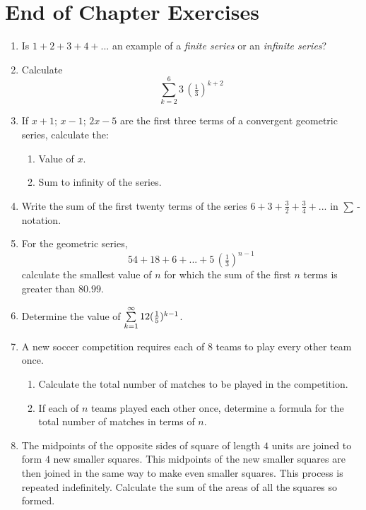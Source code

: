 \section{End of Chapter Exercises}
\begin{enumerate}

\item Is $1 + 2 + 3 + 4 + ...$ an example of a \textit{finite series} or an \textit{infinite series}?

\item Calculate $$\sum_{k=2}^6 3 \, {(\tfrac{1}{3})}^{k+2}$$

\item If $x+1$; $x-1$; $2x-5$ are the first three terms of a convergent geometric series, calculate the:
\begin{enumerate}
\item Value of $x$.
\item Sum to infinity of the series.
\end{enumerate}

\item Write the sum of the first twenty terms of the series $6 + 3 + \tfrac{3}{2} + \tfrac{3}{4} + ...$ in $\sum$\,-notation.

\item For the geometric series, $$54 + 18 + 6 + ... + 5 \, (\tfrac{1}{3})^{n-1}$$ calculate the smallest value of $n$ for which the sum of the first $n$ terms is greater than $80.99$.

\item Determine the value of $\sum_{k=1}^\infty \limits 12(\tfrac{1}{5})^{k-1} $.

\item A new soccer competition requires each of $8$ teams to play every other team once.
\begin{enumerate}
\item Calculate the total number of matches to be played in the competition.
\item If each of $n$ teams played each other once, determine a formula for the total number of matches in terms of $n$.
\end{enumerate}

\item The midpoints of the opposite sides of square of length $4$ units are joined to form $4$ new smaller squares. This midpoints of the new smaller squares are then joined in the same way to make even smaller squares. This process is repeated indefinitely. Calculate the sum of the areas of all the squares so formed.


\end{enumerate}
